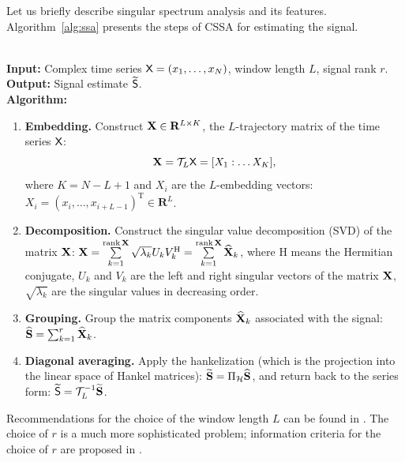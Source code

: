 \documentclass[engproc, submit, article,pdftex,moreauthors]{Definitions/mdpi}
\def\spaceR{\mathbf{R}}
\DeclareMathOperator\rank{rank}
\begin{document}
Let us briefly describe singular spectrum analysis and its features. Algorithm~\ref{alg:ssa} presents the steps of CSSA for estimating the signal.

\begin{Algorithm}
\label{alg:ssa}
~\\
\textbf{Input:} Complex time series $\textsf{X} = (x_1, \dots, x_N)$, window length $L$,
    signal rank $r$.\\
\textbf{Output:} Signal estimate $\widetilde{\textsf{S}}$.\\
\textbf{Algorithm:}
\begin{enumerate}
    \item \textbf{Embedding.}
        \label{item:embedding}
        Construct $\bfX \in \spaceR^{L \times K}$, the $L$-trajectory matrix of the time series $\textsf{X}$:
        $$\mathbf{X} = \mathcal{T}_L \textsf{X} = [X_1 : \dots X_K],$$
        where $K = N - L + 1$
        and $X_i$ are the $L$-embedding vectors:
        $X_i = (x_i, \dots, x_{i+L-1})^\mathrm{T} \in \spaceR^L$.
    \item \textbf{Decomposition.}
        \label{item:decomposition}
        Construct the singular value decomposition (SVD) of the matrix $\mathbf{X}$:
        $\bfX =
        \sum\limits_{k=1}^{\rank \bfX} \sqrt{\lambda_k} U_k V_k^\mathrm{H} = \sum\limits_{k=1}^{\rank \bfX} \widehat{\bfX}_k$,
        where $\mathrm{H}$ means the Hermitian conjugate, $U_k$ and $V_k$ are the left and right singular vectors of the matrix $\mathbf{X}$,
        $\sqrt{\lambda_k}$ are the singular values in decreasing order.
    \item \textbf{Grouping.} Group the matrix components $\widehat{\mathbf{X}}_k$ associated with the signal:
        $\widehat{\mathbf{S}} = \sum_{k=1}^r \widehat{\mathbf{X}}_k$.
    \item \textbf{Diagonal averaging.}
        \label{item:reconstruction}
        Apply the hankelization (which is the projection into the linear space of Hankel matrices):
        $\widetilde{\mathbf{S}} = \Pi_{\mathcal{H}} \widehat{\mathbf{S}}$,
        and return back to the series form:
        $\widetilde{\textsf{S}} = \mathcal{T}_L^{-1} \widetilde{\mathbf{S}}$.
\end{enumerate}
\end{Algorithm}

Recommendations for the choice of the window length $L$ can be found in \cite{Golyandina.etal2018,Golyandina2010}. The choice of $r$ is a much more sophisticated problem; information criteria for the choice of $r$ are proposed in \cite{Golyandina.Zvonarev2024}.
\end{document}
